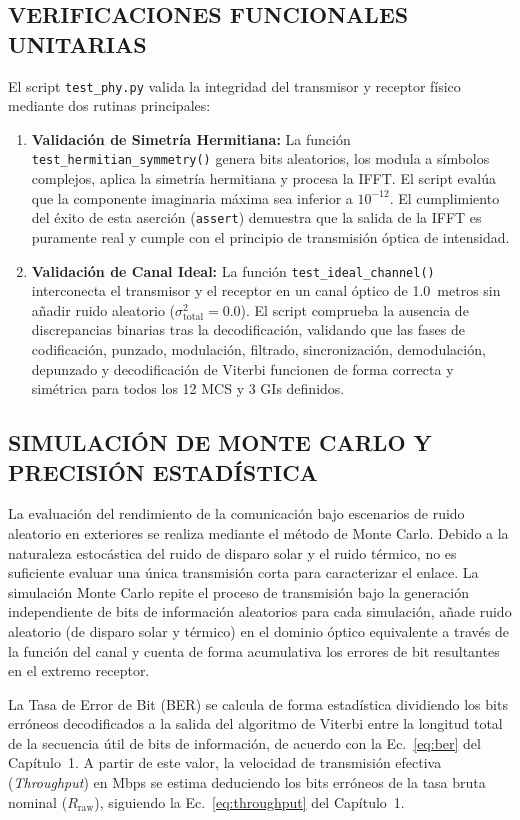 \subsection{VERIFICACIONES FUNCIONALES UNITARIAS}
El script \texttt{test\_phy.py} valida la integridad del transmisor y receptor físico mediante dos rutinas principales:
\begin{enumerate}
\item \textbf{Validación de Simetría Hermitiana:} La función \texttt{test\_hermitian\_symmetry()} genera bits aleatorios, los modula a símbolos complejos, aplica la simetría hermitiana y procesa la IFFT. El script evalúa que la componente imaginaria máxima sea inferior a $10^{-12}$. El cumplimiento del éxito de esta aserción (\texttt{assert}) demuestra que la salida de la IFFT es puramente real y cumple con el principio de transmisión óptica de intensidad.
\item \textbf{Validación de Canal Ideal:} La función \texttt{test\_ideal\_channel()} interconecta el transmisor y el receptor en un canal óptico de 1.0~metros sin añadir ruido aleatorio ($\sigma^2_{\text{total}} = 0.0$). El script comprueba la ausencia de discrepancias binarias tras la decodificación, validando que las fases de codificación, punzado, modulación, filtrado, sincronización, demodulación, depunzado y decodificación de Viterbi funcionen de forma correcta y simétrica para todos los 12 MCS y 3 GIs definidos.
\end{enumerate}

\subsection{SIMULACIÓN DE MONTE CARLO Y PRECISIÓN ESTADÍSTICA}
La evaluación del rendimiento de la comunicación bajo escenarios de ruido aleatorio en exteriores se realiza mediante el método de Monte Carlo. Debido a la naturaleza estocástica del ruido de disparo solar y el ruido térmico, no es suficiente evaluar una única transmisión corta para caracterizar el enlace. La simulación Monte Carlo repite el proceso de transmisión bajo la generación independiente de bits de información aleatorios para cada simulación, añade ruido aleatorio (de disparo solar y térmico) en el dominio óptico equivalente a través de la función del canal y cuenta de forma acumulativa los errores de bit resultantes en el extremo receptor.

La Tasa de Error de Bit (BER) se calcula de forma estadística dividiendo los bits erróneos decodificados a la salida del algoritmo de Viterbi entre la longitud total de la secuencia útil de bits de información, de acuerdo con la Ec.~\ref{eq:ber} del Capítulo~1. A partir de este valor, la velocidad de transmisión efectiva (\textit{Throughput}) en Mbps se estima deduciendo los bits erróneos de la tasa bruta nominal ($R_{\text{raw}}$), siguiendo la Ec.~\ref{eq:throughput} del Capítulo~1. 

